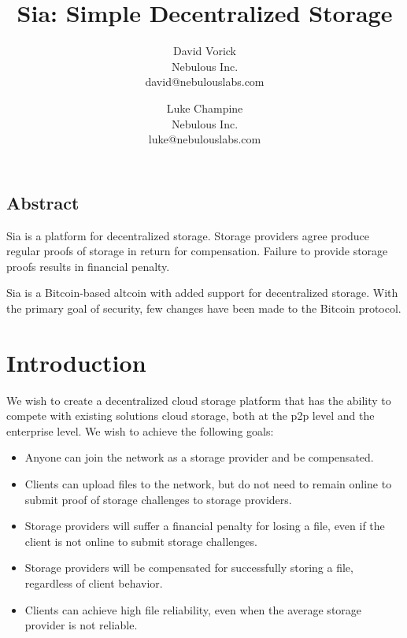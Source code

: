 \documentclass[twocolumn]{article}
\begin{document}
\frenchspacing

\title{Sia: Simple Decentralized Storage}

\author{
{\rm David Vorick}\\
Nebulous Inc.\\
david@nebulouslabs.com
\and
{\rm Luke Champine}\\
Nebulous Inc.\\
luke@nebulouslabs.com
}

\maketitle

\subsection*{Abstract}
Sia is a platform for decentralized storage.
Storage providers agree produce regular proofs of storage in return for compensation.
Failure to provide storage proofs results in financial penalty.

Sia is a Bitcoin-based altcoin with added support for decentralized storage.
With the primary goal of security, few changes have been made to the Bitcoin protocol.

\section{Introduction}
We wish to create a decentralized cloud storage platform that has the ability to compete with existing solutions cloud storage, both at the p2p level and the enterprise level.
We wish to achieve the following goals:
\begin{itemize}
	\item Anyone can join the network as a storage provider and be compensated.
	\item Clients can upload files to the network, but do not need to remain online to submit proof of storage challenges to storage providers.
	\item Storage providers will suffer a financial penalty for losing a file, even if the client is not online to submit storage challenges.
	\item Storage providers will be compensated for successfully storing a file, regardless of client behavior.
	\item Clients can achieve high file reliability, even when the average storage provider is not reliable.
\end{itemize}
\end{document}

